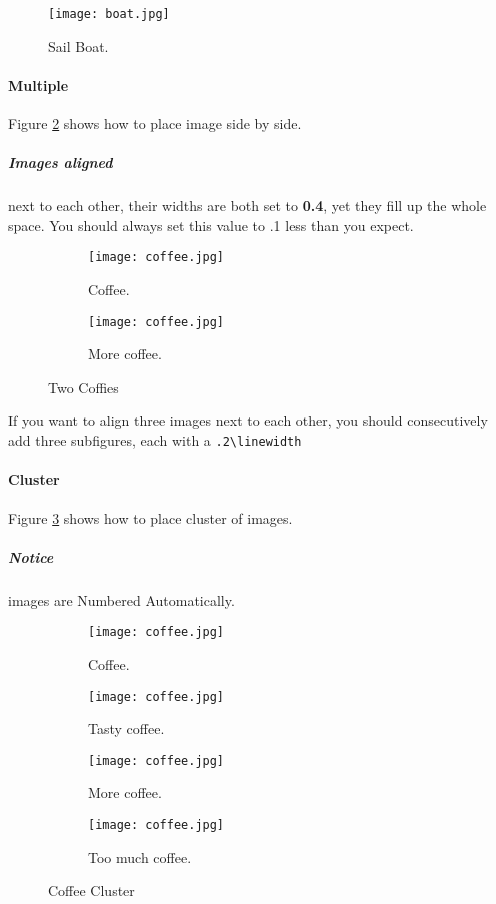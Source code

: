 \documentclass{report}[a4paper,12pt] %
\begin{document}
\begin{figure}[h]
  \texttt{[image: boat.jpg]}
  \caption{Sail Boat.}
  \label{fig:sailboat} %
\end{figure}

\newpage
\paragraph{Multiple}
Figure \ref{fig:coffee} shows how to place image side by side.

\subparagraph{Images aligned} next to each other, their widths are both set to \textbf{0.4}, yet they fill up the whole space.
You should always set this value to .1 less than you expect.

\begin{figure}[h!]
  \centering
  \begin{subfigure}[b]{0.4\linewidth}
    \texttt{[image: coffee.jpg]}
    \caption{Coffee.}
  \end{subfigure}
  \begin{subfigure}[b]{0.4\linewidth}
    \texttt{[image: coffee.jpg]}
    \caption{More coffee.}
  \end{subfigure}
  \caption{Two Coffies}
  \label{fig:coffee}
\end{figure}

If you want to align three images next to each other,
you should consecutively add three subfigures, each with a \verb|.2\linewidth|


\paragraph{Cluster}
Figure \ref{fig:coffee3} shows how to place cluster of images.

\subparagraph{Notice} images are Numbered Automatically.

\begin{figure}[h!]
  \centering
  \begin{subfigure}[b]{0.2\linewidth}
    \texttt{[image: coffee.jpg]}
     \caption{Coffee.}
  \end{subfigure}
  \begin{subfigure}[b]{0.2\linewidth}
    \texttt{[image: coffee.jpg]}
    \caption{Tasty coffee.}
  \end{subfigure}
  \begin{subfigure}[b]{0.2\linewidth}
    \texttt{[image: coffee.jpg]}
    \caption{More coffee.}
  \end{subfigure}
  \begin{subfigure}[b]{0.5\linewidth}
    \texttt{[image: coffee.jpg]}
    \caption{Too much coffee.}
  \end{subfigure}
  \caption{Coffee Cluster}
  \label{fig:coffee3}
\end{figure}
\end{document}
